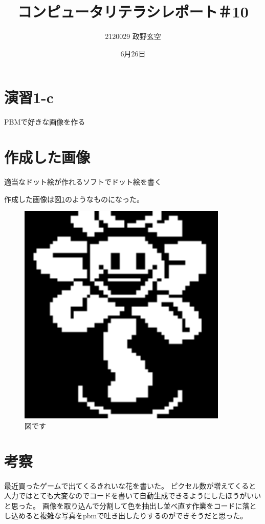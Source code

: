 \documentclass[11pt,a4j]{jarticle}
\title{コンピュータリテラシレポート＃10}
\author{2120029 政野玄空}
\date{6月26日}
\begin{document}
\maketitle

\section{演習1-c}
PBMで好きな画像を作る

\section{作成した画像}

適当なドット絵が作れるソフトでドット絵を書く

作成した画像は図\ref{fig1}のようなものになった。
\begin{figure}[htbp]
\begin{center}
\includegraphics[width=10cm]{flower.eps}

\caption{図です}\label{fig1}
\end{center}
\end{figure}

\section{考察}
最近買ったゲームで出てくるきれいな花を書いた。
ピクセル数が増えてくると人力ではとても大変なのでコードを書いて自動生成できるようにしたほうがいいと思った。
画像を取り込んで分割して色を抽出し並べ直す作業をコードに落とし込めると複雑な写真をpbmで吐き出したりするのができそうだと思った。
\end{document}
